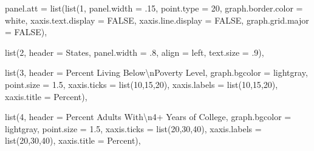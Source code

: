 \documentclass[
]{krantz}
\makeatletter
\newenvironment{Shaded}{\begin{snugshade}}{\end{snugshade}}
\newcommand{\AttributeTok}[1]{\textcolor[rgb]{0.61,0.61,0.61}{#1}}
\newcommand{\ConstantTok}[1]{\textcolor[rgb]{0,0,0}{#1}}
\newcommand{\DecValTok}[1]{\textcolor[rgb]{0.06,0.06,0.06}{#1}}
\newcommand{\FloatTok}[1]{\textcolor[rgb]{0.06,0.06,0.06}{#1}}
\newcommand{\FunctionTok}[1]{\textcolor[rgb]{0,0,0}{#1}}
\newcommand{\NormalTok}[1]{#1}
\newcommand{\SpecialCharTok}[1]{\textcolor[rgb]{0,0,0}{#1}}
\newcommand{\StringTok}[1]{\textcolor[rgb]{0.5,0.5,0.5}{#1}}
\newenvironment{kframe}{%
\medskip{}
\setlength{\fboxsep}{.8em}
 \def\at@end@of@kframe{}%
 \ifinner\ifhmode%
  \def\at@end@of@kframe{\end{minipage}}%
  \begin{minipage}{\columnwidth}%
 \fi\fi%
 \def\FrameCommand##1{\hskip\@totalleftmargin \hskip-\fboxsep
 \colorbox{shadecolor}{##1}\hskip-\fboxsep
     \hskip-\linewidth \hskip-\@totalleftmargin \hskip\columnwidth}%
 \MakeFramed {\advance\hsize-\width
   \@totalleftmargin\z@ \linewidth\hsize
   \@setminipage}}%
 {\par\unskip\endMakeFramed%
 \at@end@of@kframe}
\renewenvironment{Shaded}{\begin{kframe}}{\end{kframe}}
\makeatother
\begin{document}
\begin{Shaded}
\begin{Highlighting}[]
    \AttributeTok{panel.att =} \FunctionTok{list}\NormalTok{(}\FunctionTok{list}\NormalTok{(}\DecValTok{1}\NormalTok{, }\AttributeTok{panel.width =}\NormalTok{ .}\DecValTok{15}\NormalTok{, }\AttributeTok{point.type =} \DecValTok{20}\NormalTok{,}
                    \AttributeTok{graph.border.color =} \StringTok{\textquotesingle{}white\textquotesingle{}}\NormalTok{,}
                    \AttributeTok{xaxis.text.display =} \ConstantTok{FALSE}\NormalTok{, }\AttributeTok{xaxis.line.display =} \ConstantTok{FALSE}\NormalTok{,}
                    \AttributeTok{graph.grid.major =} \ConstantTok{FALSE}\NormalTok{),}
    
                \FunctionTok{list}\NormalTok{(}\DecValTok{2}\NormalTok{, }\AttributeTok{header =} \StringTok{\textquotesingle{}States\textquotesingle{}}\NormalTok{, }\AttributeTok{panel.width =}\NormalTok{ .}\DecValTok{8}\NormalTok{, }
                    \AttributeTok{align =} \StringTok{\textquotesingle{}left\textquotesingle{}}\NormalTok{, }\AttributeTok{text.size =}\NormalTok{ .}\DecValTok{9}\NormalTok{),}

                \FunctionTok{list}\NormalTok{(}\DecValTok{3}\NormalTok{, }\AttributeTok{header =} \StringTok{\textquotesingle{}Percent Living Below}\SpecialCharTok{\textbackslash{}n}\StringTok{Poverty Level\textquotesingle{}}\NormalTok{,}
                    \AttributeTok{graph.bgcolor =} \StringTok{\textquotesingle{}lightgray\textquotesingle{}}\NormalTok{, }\AttributeTok{point.size =} \FloatTok{1.5}\NormalTok{,}
                    \AttributeTok{xaxis.ticks =} \FunctionTok{list}\NormalTok{(}\DecValTok{10}\NormalTok{,}\DecValTok{15}\NormalTok{,}\DecValTok{20}\NormalTok{), }
                    \AttributeTok{xaxis.labels =} \FunctionTok{list}\NormalTok{(}\DecValTok{10}\NormalTok{,}\DecValTok{15}\NormalTok{,}\DecValTok{20}\NormalTok{),}
                    \AttributeTok{xaxis.title =} \StringTok{\textquotesingle{}Percent\textquotesingle{}}\NormalTok{),}

                \FunctionTok{list}\NormalTok{(}\DecValTok{4}\NormalTok{, }\AttributeTok{header =} \StringTok{\textquotesingle{}Percent Adults With}\SpecialCharTok{\textbackslash{}n}\StringTok{4+ Years of College\textquotesingle{}}\NormalTok{,}
                    \AttributeTok{graph.bgcolor =} \StringTok{\textquotesingle{}lightgray\textquotesingle{}}\NormalTok{, }\AttributeTok{point.size =} \FloatTok{1.5}\NormalTok{,}
                    \AttributeTok{xaxis.ticks =} \FunctionTok{list}\NormalTok{(}\DecValTok{20}\NormalTok{,}\DecValTok{30}\NormalTok{,}\DecValTok{40}\NormalTok{), }
                    \AttributeTok{xaxis.labels =} \FunctionTok{list}\NormalTok{(}\DecValTok{20}\NormalTok{,}\DecValTok{30}\NormalTok{,}\DecValTok{40}\NormalTok{), }
                    \AttributeTok{xaxis.title =} \StringTok{\textquotesingle{}Percent\textquotesingle{}}\NormalTok{),}
    

\end{Highlighting}
\end{Shaded}
\end{document}
